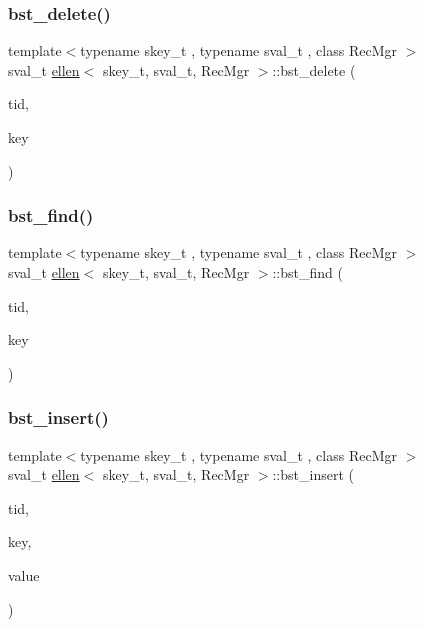 \subsubsection{\texorpdfstring{bst\+\_\+delete()}{bst\_delete()}}
{\footnotesize\ttfamily template$<$typename skey\+\_\+t , typename sval\+\_\+t , class Rec\+Mgr $>$ \\
sval\+\_\+t \hyperlink{classellen}{ellen}$<$ skey\+\_\+t, sval\+\_\+t, Rec\+Mgr $>$\+::bst\+\_\+delete (\begin{DoxyParamCaption}\item[{const int}]{tid,  }\item[{skey\+\_\+t}]{key }\end{DoxyParamCaption})}

\mbox{\label{classellen_a129a7e46ca479682828ef6de7ae6b54f}} 
\subsubsection{\texorpdfstring{bst\+\_\+find()}{bst\_find()}}
{\footnotesize\ttfamily template$<$typename skey\+\_\+t , typename sval\+\_\+t , class Rec\+Mgr $>$ \\
sval\+\_\+t \hyperlink{classellen}{ellen}$<$ skey\+\_\+t, sval\+\_\+t, Rec\+Mgr $>$\+::bst\+\_\+find (\begin{DoxyParamCaption}\item[{const int}]{tid,  }\item[{skey\+\_\+t}]{key }\end{DoxyParamCaption})}

\mbox{\label{classellen_a45033b3247efaf96946bbdd0583d9fe2}} 
\subsubsection{\texorpdfstring{bst\+\_\+insert()}{bst\_insert()}}
{\footnotesize\ttfamily template$<$typename skey\+\_\+t , typename sval\+\_\+t , class Rec\+Mgr $>$ \\
sval\+\_\+t \hyperlink{classellen}{ellen}$<$ skey\+\_\+t, sval\+\_\+t, Rec\+Mgr $>$\+::bst\+\_\+insert (\begin{DoxyParamCaption}\item[{const int}]{tid,  }\item[{skey\+\_\+t}]{key,  }\item[{sval\+\_\+t}]{value }\end{DoxyParamCaption})}

